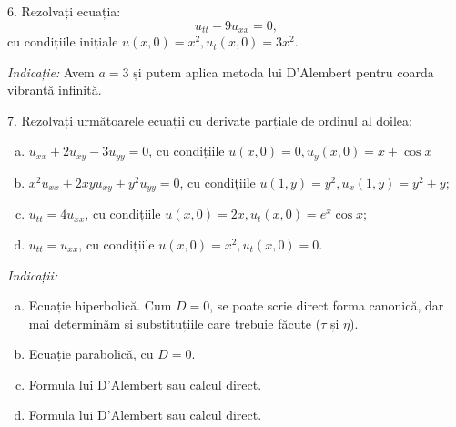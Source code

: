 \vspace{1cm}

6. Rezolvați ecuația:
\[
  u_{tt} - 9 u_{xx} = 0,
\]
cu condițiile inițiale $ u(x, 0) = x^2, u_t(x, 0) = 3x^2 $.

\emph{Indicație:} Avem $ a = 3 $ și putem aplica metoda lui D'Alembert pentru
coarda vibrantă infinită.

\vspace{1cm}

7. Rezolvați următoarele ecuații cu derivate parțiale de ordinul al doilea:
\begin{enumerate}[(a)]
\item $ u_{xx} + 2u_{xy} - 3u_{yy} = 0 $, cu condițiile $ u(x, 0) = 0, u_y(x, 0) = x + \cos x $
\item $ x^2 u_{xx} + 2xy u_{xy} + y^2 u_{yy} = 0 $, cu condițiile $ u(1, y) = y^2, u_x(1, y) = y^2 + y $;
\item $ u_{tt} = 4u_{xx} $, cu condițiile $ u(x, 0) = 2x, u_t(x, 0) = e^x \cos x $;
\item $ u_{tt} = u_{xx} $, cu condițiile $ u(x, 0) = x^2, u_t(x, 0) = 0 $.
\end{enumerate}

\emph{Indicații:}
\begin{enumerate}[(a)]
\item Ecuație hiperbolică. Cum $ D = 0 $, se poate scrie direct forma canonică, dar mai
  determinăm și substituțiile care trebuie făcute ($\tau$ și $\eta$).
\item Ecuație parabolică, cu $ D = 0 $.
\item Formula lui D'Alembert sau calcul direct.
\item Formula lui D'Alembert sau calcul direct.
\end{enumerate}

